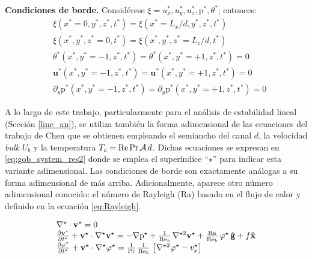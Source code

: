 \textbf{Condiciones de borde.} Considérese $\xi= u^*_x, u^*_y, u^*_z, \text{p}^*, \theta^*$; entonces:
\begin{align}
&\xi(x^*=0,y^*,z^*,t^*) = \xi(x^*=L_x/d,y^*,z^*,t^*) 
	\label{eq:bc_1} \\
&\xi(x^*,y^*,z^*=0,t^*) = \xi(x^*,y^*,z^*=L_z/d,t^*) 
	\label{eq:bc_2} \\
&\theta^*(x^*,y^*=-1,z^*,t^*)       = \theta^*(x^*,y^*=+1,z^*,t^*) = 0
	\label{eq:bc_3} \\
&\mathbf{u^*}(x^*,y^*=-1,z^*,t^*)   = \mathbf{u^*}(x^*,y^*=+1,z^*,t^*) = 0
	\label{eq:bc_4} \\
&\partial_y \text{p}^*(x^*,y^*=-1,z^*,t^*) = \partial_y \text{p}^*(x^*,y^*=+1,z^*,t^*) = 0
	\label{eq:bc_5}
\end{align}


A lo largo de este trabajo, particularmente para el análisis de estabilidad lineal (Sección \ref{line_an}), se utiliza también la forma adimensional de las ecuaciones del trabajo de Chen \cite{chen1996linear} que se obtienen empleando el  semiancho del canal $d$, la velocidad \textit{bulk} $U_b$ y la temperatura $T_c = \text{Re} \hspace{0.5mm} \text{Pr} \hspace{0.5mm} \mathcal{A} \hspace{0.5mm} d$. Dichas ecuaciones se expresan en \ref{eq:gob_system_res2} donde se emplea el superíndice ``${\star}$'' para indicar esta variante adimensional. Las condiciones de borde son exactamente análogas a su forma adimensional de más arriba. Adicionalmente, aparece otro número adimensional conocido: el número de Rayleigh (Ra) basado en el flujo de calor y definido en la ecuación \ref{eq:Rayleigh}.

\begin{equation}
\begin{array}{l}
    \nabla^{\star} \cdot \mathbf{v^{\star}} = 0 \\
    \frac{\partial \mathbf{v^{\star}}}{\partial t^{\star}} + \mathbf{v^{\star}} \cdot \nabla^{\star} \mathbf{v^{\star}} = 
    -\nabla \text{p}^{\star} + \frac{1}{\text{Re}_b} \hspace{0.5mm} \nabla^{{\star}2} \mathbf{v^{\star}} + \frac{\text{Ra}}{\text{Re}_b} \hspace{0.5mm} \varphi^{\star} \hspace{0.5mm} \mathbf{\hat{g}} + f \mathbf{\hat{x}} \\
    \frac{\partial \varphi^{\star}}{\partial t^{\star}} + \mathbf{v^{\star}} \cdot \nabla^{\star} \varphi^{\star} = 
    \frac{1}{\text{Pr}}\hspace{0.5mm}  \frac{1}{\text{Re}_b} \hspace{0.5mm} \left[ \nabla^{{\star}2} \varphi^{\star} - v_x^{\star} \right]  
\end{array}
\label{eq:gob_system_res2}
\end{equation}

